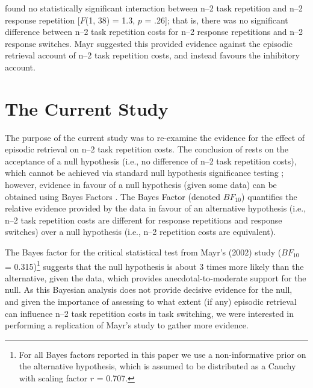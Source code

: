 \documentclass[a4paper, doc, natbib]{apa6}
\begin{document}
\cite{Mayr2002} found no statistically significant interaction between n--2 task repetition and n--2 response repetition [$F$(1, 38) = 1.3, $p$ = .26]; that is, there was no significant difference between n--2 task repetition costs for n--2 response repetitions and n--2 response switches. Mayr suggested this provided evidence against the episodic retrieval account of n--2 task repetition costs, and instead favours the inhibitory account.

\section{The Current Study}
The purpose of the current study was to re-examine the evidence for the effect of episodic retrieval on n--2 task repetition costs. The conclusion of \cite{Mayr2002} rests on the acceptance of a null hypothesis (i.e., no difference of n--2 task repetition costs), which cannot be achieved via standard null hypothesis significance testing \citep[NHST;][]{Gallistel2009, Wagenmakers2007}; however, evidence in favour of a null hypothesis (given some data) can be obtained using Bayes Factors \citep[e.g.,][]{Rouder2009}. The Bayes Factor (denoted $BF_{10}$) quantifies the relative evidence provided by the data in favour of an alternative hypothesis (i.e., n--2 task repetition costs are different for response repetitions and response switches) over a null hypothesis (i.e., n--2 repetition costs are equivalent). 

The Bayes factor for the critical statistical test from Mayr's (2002) study ($BF_{10}$ = 0.315)\footnote{For all Bayes factors reported in this paper we use a non-informative prior on the alternative hypothesis, which is assumed to be distributed as a Cauchy with scaling factor $r$ = 0.707.} suggests that the null hypothesis is about 3 times more likely than the alternative, given the data, which provides anecdotal-to-moderate support for the null. As this Bayesian analysis does not provide decisive evidence for the null, and given the importance of assessing to what extent (if any) episodic retrieval can influence n--2 task repetition costs in task switching, we were interested in performing a replication of Mayr's study to gather more evidence.
\end{document}
